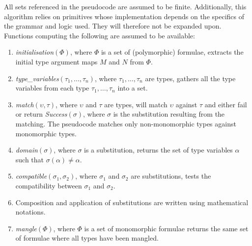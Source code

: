 \documentclass[]{ceurart}
\begin{document}
All sets referenced in the pseudocode are assumed to be finite. Additionally, this algorithm relies on primitives whose implementation depends on the specifics of the grammar and logic used. They will therefore not be expanded upon. Functions computing the following are assumed to be available: 
\begin{enumerate}
   \item[\labelitemi] \emph{initialisation\((\Phi)\)}, where \(\Phi\) is a set of (polymorphic) formulae, extracts the initial type argument maps \(M\) and \(N\) from \(\Phi\).
   \item[\labelitemi] \emph{type\_variables\((\tau_1, \dots, \tau_n)\)}, where \(\tau_1, \dots,\tau_n\) are types, gathers all the type variables from each type \(\tau_1, \dots, \tau_n\) into a set.
   \item[\labelitemi] \emph{match\((\upsilon, \tau)\)}, where \(\upsilon\) and \(\tau\) are types, will match \(\upsilon\) against \(\tau\) and either fail or return \emph{Success\((\sigma)\)}, where \(\sigma\) is the substitution resulting from the matching. The pseudocode matches only non-monomorphic types against monomorphic types.
   \item[\labelitemi] \emph{domain\((\sigma)\)}, where \(\sigma\) is a substitution, returns the set of type variables \(\alpha\) such that \(\sigma(
   \alpha) \not= \alpha\).
   \item[\labelitemi] \emph{compatible\((\sigma_1, \sigma_2)\)}, where \(\sigma_1\) and \(\sigma_2\) are substitutions, tests the compatibility between \(\sigma_1\) and \(\sigma_2\).
   \item[\labelitemi] Composition and application of substitutions are written using mathematical notations.
   \item[\labelitemi] \emph{mangle\((\Phi)\)}, where \(\Phi\) is a set of monomorphic formulae returns the same set of formulae where all types have been mangled.
\end{enumerate}
\end{document}
